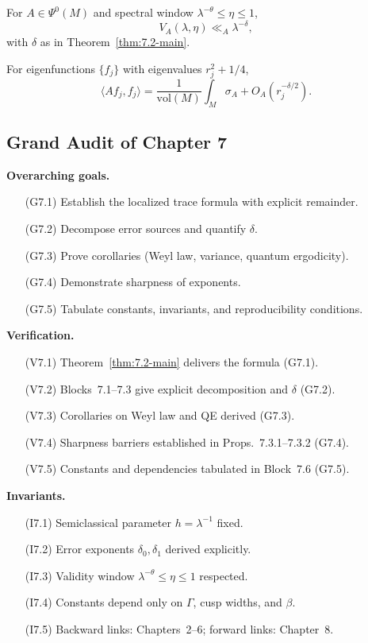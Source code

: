\begin{corollary}
For $A\in\Psi^0(M)$ and spectral window $\lambda^{-\theta}\le\eta\le1$,
\[
  V_A(\lambda,\eta) \ll_A \lambda^{-\delta},
\]
with $\delta$ as in Theorem~\ref{thm:7.2-main}.
\end{corollary}

\begin{corollary}
For eigenfunctions $\{f_j\}$ with eigenvalues $r_j^2+1/4$,
\[
  \langle Af_j,f_j\rangle
  = \frac{1}{\mathrm{vol}(M)} \int_M \sigma_A
  + O_A(r_j^{-\delta/2}).
\]
\end{corollary}

\subsection{Grand Audit of Chapter 7} \label{subsec:7.audit}

\noindent\textbf{Overarching goals.}
\begin{itemize}
  \item[(G7.1)] Establish the localized trace formula with explicit remainder.
  \item[(G7.2)] Decompose error sources and quantify $\delta$.
  \item[(G7.3)] Prove corollaries (Weyl law, variance, quantum ergodicity).
  \item[(G7.4)] Demonstrate sharpness of exponents.
  \item[(G7.5)] Tabulate constants, invariants, and reproducibility conditions.
\end{itemize}

\medskip
\noindent\textbf{Verification.}
\begin{itemize}
  \item[(V7.1)] Theorem~\ref{thm:7.2-main} delivers the formula (G7.1).
  \item[(V7.2)] Blocks~7.1–7.3 give explicit decomposition and $\delta$ (G7.2).
  \item[(V7.3)] Corollaries on Weyl law and QE derived (G7.3).
  \item[(V7.4)] Sharpness barriers established in Props.~7.3.1–7.3.2 (G7.4).
  \item[(V7.5)] Constants and dependencies tabulated in Block~7.6 (G7.5).
\end{itemize}

\medskip
\noindent\textbf{Invariants.}
\begin{itemize}
  \item[(I7.1)] Semiclassical parameter $h=\lambda^{-1}$ fixed.
  \item[(I7.2)] Error exponents $\delta_0,\delta_1$ derived explicitly.
  \item[(I7.3)] Validity window $\lambda^{-\theta}\le\eta\le1$ respected.
  \item[(I7.4)] Constants depend only on $\Gamma$, cusp widths, and $\beta$.
  \item[(I7.5)] Backward links: Chapters~2–6; forward links: Chapter~8.
\end{itemize}

